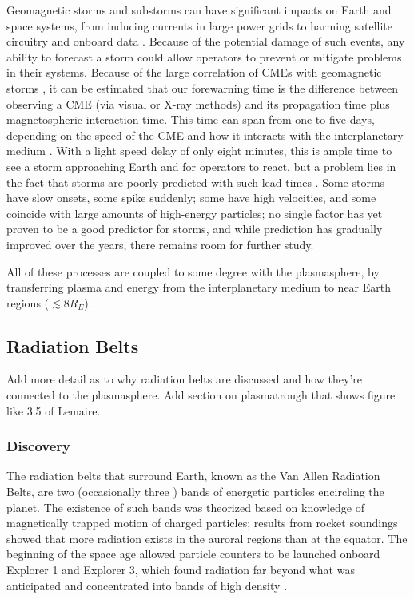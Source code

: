 Geomagnetic storms and substorms can have significant impacts on Earth and space systems, from inducing currents in large power grids to harming satellite circuitry and onboard data \citep{1989Storm}. Because of the potential damage of such events, any ability to forecast a storm could allow operators to prevent or mitigate problems in their systems. Because of the large correlation of CMEs with geomagnetic storms \citep{Yermolaev}, it can be estimated that our forewarning time is the difference between observing a CME (via visual or X-ray methods) and its propagation time plus magnetospheric interaction time. This time can span from one to five days, depending on the speed of the CME and how it interacts with the interplanetary medium \citep{StormSources}. With a light speed delay of only eight minutes, this is ample time to see a storm approaching Earth and for operators to react, but a problem lies in the fact that storms are poorly predicted with such lead times \citep{WeigelDecision}. Some storms have slow onsets, some spike suddenly; some have high velocities, and some coincide with large amounts of high-energy particles; no single factor has yet proven to be a good predictor for storms, and while prediction has gradually improved over the years, there remains room for further study. 

All of these processes are coupled to some degree with the plasmasphere, by transferring plasma and energy from the interplanetary medium to near Earth regions ($\lesssim 8 R_E$). 


\subsection{Radiation Belts}

\vnote Add more detail as to why radiation belts are discussed and how they're connected to the plasmasphere. Add section on plasmatrough that shows figure like 3.5 of Lemaire.

\subsubsection{Discovery}
The radiation belts that surround Earth, known as the Van Allen Radiation Belts, are two (occasionally three \citep{LinksBetweenPlasmapauseRadiationBelt}) bands of energetic particles encircling the planet. The existence of such bands was theorized based on knowledge of magnetically trapped motion of charged particles; results from rocket soundings showed that more radiation exists in the auroral regions than at the equator.  The beginning of the space age allowed particle counters to be launched onboard Explorer 1 and Explorer 3, which found radiation far beyond what was anticipated and concentrated into bands of high density \citep{MagnetoHistory}.

